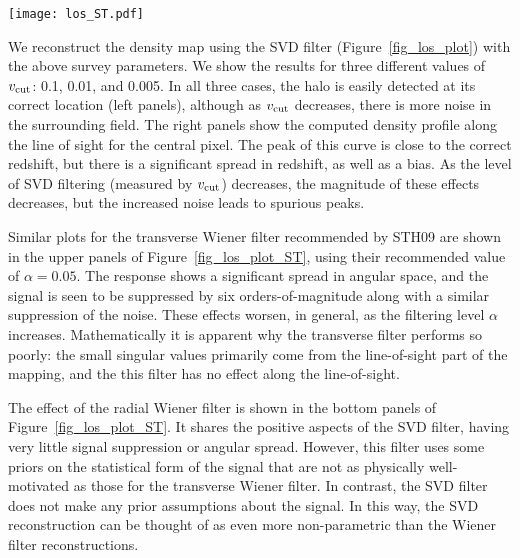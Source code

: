 \begin{figure*}[t]
 \centering
 \texttt{[image: los\_ST.pdf]}
 \caption[The effect of Wiener filtering]{
   The effect of Wiener filtering on the same input as 
   Figure~\ref{fig_los_plot}. Here we have used both transverse 
   \textit{(top panels)}
   and radial \textit{(bottom panels)} Wiener filtering, both down-tuned 
   by $\alpha = 0.05$ (the value recommended by STH09).  
   The transverse Wiener filter suppresses the response by several 
   orders of magnitude; a closer view of the line-of-sight peak is shown 
   in the inset plot.  The radial Wiener filter gives similar angular 
   results to the SVD filter, but takes much longer to compute.
   \label{fig_los_plot_ST}} 
\end{figure*}

We reconstruct the density map using the SVD filter 
(Figure~\ref{fig_los_plot}) with the above survey parameters.  
We show the results for three different values of $v_{\rm cut}$: 
0.1, 0.01, and 0.005.  In all three cases, the halo is easily 
detected at its correct location (left panels),
although as $v_{\rm cut}$ decreases, there is more noise in the 
surrounding field.  The right panels show the computed density profile
along the line of sight for the central pixel. 
The peak of this curve is close to the correct redshift, 
but there is a significant spread in redshift, as well as a bias.
As the level of SVD filtering (measured by $v_{\rm cut}$) decreases, 
the magnitude of these effects decreases, but the increased noise 
leads to spurious peaks. 

Similar plots for the transverse Wiener filter recommended by STH09 are
shown in the upper panels of Figure~\ref{fig_los_plot_ST}, using their 
recommended value of $\alpha = 0.05$. 
The response shows a significant spread in angular space, and 
the signal is seen to be suppressed by six orders-of-magnitude along with
a similar suppression of the noise. 
These effects worsen, 
in general, as the filtering level $\alpha$ increases.
Mathematically it is apparent why the transverse filter performs so poorly:
the small singular values primarily come from the line-of-sight 
part of the mapping, and the this filter has no effect along the line-of-sight.

The effect of the radial Wiener filter is shown in the bottom panels of 
Figure~\ref{fig_los_plot_ST}.
It shares the positive aspects of the SVD filter, having very 
little signal suppression or angular spread.
However, this filter uses some priors on the statistical form of 
the signal that are not as physically well-motivated as those for the 
transverse Wiener filter.  In contrast, the SVD filter does not make 
any prior assumptions about the signal. In this way, the SVD reconstruction
can be thought of as even more non-parametric than the Wiener filter
reconstructions.

